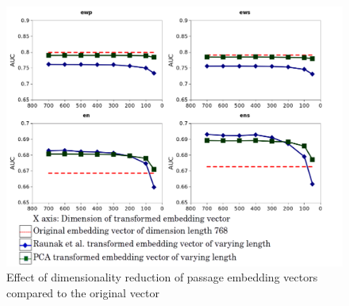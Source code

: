 \begin{figure}[h]
  \centering
  \includegraphics[width=\linewidth]{graphics/emb_vec_dim_red_exp.png}
  \caption{Effect of dimensionality reduction of passage embedding vectors compared to the original vector}
  \label{fig:dimred}
\end{figure}
